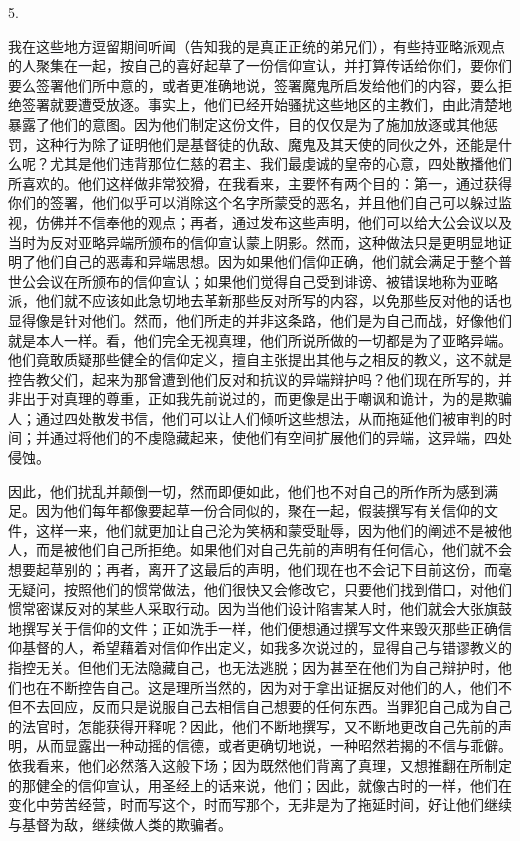 5. \par

我在这些地方逗留期间听闻（告知我的是真正正统的弟兄们），有些持亚略派观点的人聚集在一起，按自己的喜好起草了一份信仰宣认，并打算传话给你们，要你们要么签署他们所中意的，或者更准确地说，签署魔鬼所启发给他们的内容，要么拒绝签署就要遭受放逐。事实上，他们已经开始骚扰这些地区的主教们，由此清楚地暴露了他们的意图。因为他们制定这份文件，目的仅仅是为了施加放逐或其他惩罚，这种行为除了证明他们是基督徒的仇敌、魔鬼及其天使的同伙之外，还能是什么呢？尤其是他们违背那位仁慈的君主、我们最虔诚的皇帝的心意，四处散播他们所喜欢的。他们这样做非常狡猾，在我看来，主要怀有两个目的：第一，通过获得你们的签署，他们似乎可以消除这个名字所蒙受的恶名，并且他们自己可以躲过监视，仿佛并不信奉他的观点；再者，通过发布这些声明，他们可以给大公会议以及当时为反对亚略异端所颁布的信仰宣认蒙上阴影。然而，这种做法只是更明显地证明了他们自己的恶毒和异端思想。因为如果他们信仰正确，他们就会满足于整个普世公会议在所颁布的信仰宣认；如果他们觉得自己受到诽谤、被错误地称为亚略派，他们就不应该如此急切地去革新那些反对所写的内容，以免那些反对他的话也显得像是针对他们。然而，他们所走的并非这条路，他们是为自己而战，好像他们就是本人一样。看，他们完全无视真理，他们所说所做的一切都是为了亚略异端。他们竟敢质疑那些健全的信仰定义，擅自主张提出其他与之相反的教义，这不就是控告教父们，起来为那曾遭到他们反对和抗议的异端辩护吗？他们现在所写的，并非出于对真理的尊重，正如我先前说过的，而更像是出于嘲讽和诡计，为的是欺骗人；通过四处散发书信，他们可以让人们倾听这些想法，从而拖延他们被审判的时间；并通过将他们的不虔隐藏起来，使他们有空间扩展他们的异端，这异端，四处侵蚀。\par

因此，他们扰乱并颠倒一切，然而即便如此，他们也不对自己的所作所为感到满足。因为他们每年都像要起草一份合同似的，聚在一起，假装撰写有关信仰的文件，这样一来，他们就更加让自己沦为笑柄和蒙受耻辱，因为他们的阐述不是被他人，而是被他们自己所拒绝。如果他们对自己先前的声明有任何信心，他们就不会想要起草别的；再者，离开了这最后的声明，他们现在也不会记下目前这份，而毫无疑问，按照他们的惯常做法，他们很快又会修改它，只要他们找到借口，对他们惯常密谋反对的某些人采取行动。因为当他们设计陷害某人时，他们就会大张旗鼓地撰写关于信仰的文件；正如洗手一样，他们便想通过撰写文件来毁灭那些正确信仰基督的人，希望藉着对信仰作出定义，如我多次说过的，显得自己与错谬教义的指控无关。但他们无法隐藏自己，也无法逃脱；因为甚至在他们为自己辩护时，他们也在不断控告自己。这是理所当然的，因为对于拿出证据反对他们的人，他们不但不去回应，反而只是说服自己去相信自己想要的任何东西。当罪犯自己成为自己的法官时，怎能获得开释呢？因此，他们不断地撰写，又不断地更改自己先前的声明，从而显露出一种动摇的信德，或者更确切地说，一种昭然若揭的不信与乖僻。依我看来，他们必然落入这般下场；因为既然他们背离了真理，又想推翻在所制定的那健全的信仰宣认，用圣经上的话来说，他们；因此，就像古时的一样，他们在变化中劳苦经营，时而写这个，时而写那个，无非是为了拖延时间，好让他们继续与基督为敌，继续做人类的欺骗者。\par

